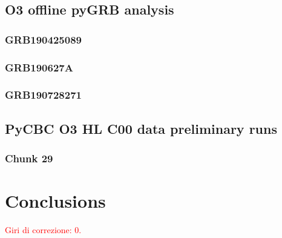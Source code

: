 \documentclass[binding=0.6cm, LaM]{sapthesis}
\newcommand{\fpg}[1]{\textcolor{red}{#1} }
\begin{document}
\section{O3 offline pyGRB analysis}

\subsection{GRB190425089}

\subsection{GRB190627A}

\subsection{GRB190728271}

\section{PyCBC O3 HL C00 data preliminary runs}

\subsection{Chunk 29}

\chapter*{Conclusions}

\fpg{Giri di correzione: 0.}%

\backmatter
\cleardoublepage

\end{document}
